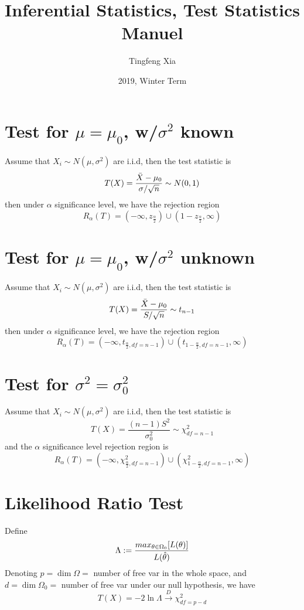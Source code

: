 \documentclass{article}
\title{Inferential Statistics, Test Statistics Manuel}
\author{Tingfeng Xia}
\date{2019, Winter Term}
\begin{document}
\maketitle

\section{Test for $\mu = \mu_0$, w/$\sigma^2$ known}
Assume that $X_i\sim N(\mu, \sigma^2)$ are i.i.d, then the test 
statistic is
\begin{equation*}
    T(X) = \frac{\Bar{X} - \mu_0}{\sigma / \sqrt{n}} \sim N(0, 1)
\end{equation*}
then under $\alpha$ significance level, we have the rejection region
\begin{equation*}
    R_\alpha(T) = ( -\infty, z_{\frac{\alpha}{2}} ) \cup 
(1-z_{\frac{\alpha}{2}}, \infty )
\end{equation*}

\section{Test for $\mu = \mu_0$, w/$\sigma^2$ unknown}
Assume that $X_i\sim N(\mu, \sigma^2)$ are i.i.d, then the test 
statistic is
\begin{equation*}
    T(X) = \frac{\Bar{X} - \mu_0}{S / \sqrt{n}} \sim t_{n-1}
\end{equation*}
then under $\alpha$ significance level, we have the rejection region
\begin{equation*}
    R_\alpha(T) = ( -\infty, t_{\frac{\alpha}{2}, df=n-1} ) \cup 
(t_{1-\frac{\alpha}{2}, df=n-1}, \infty )
\end{equation*}

\section{Test for $\sigma^2 = \sigma_0^2$}
Assume that $X_i\sim N(\mu, \sigma^2)$ are i.i.d, then the test 
statistic is
\begin{equation*}
    T(X) = \frac{(n-1)S^2}{\sigma_0^2} \sim \chi^2_{df = n-1}
\end{equation*}
and the $\alpha$ significance level rejection region is 
\begin{equation*}
    R_\alpha(T) = ( -\infty, \chi^2_{\frac{\alpha}{2}, df=n-1} ) \cup 
(\chi^2_{1-\frac{\alpha}{2}, df=n-1}, \infty )
\end{equation*}

\section{Likelihood Ratio Test}
Define
\begin{equation*}
    \Lambda := \frac{max_{\theta \in 
\Omega_0}[L(\theta)]}{L(\Hat{\theta})}
\end{equation*}
Denoting $p = \dim\Omega =$ number of free var in the whole space, and 
$d = \dim\Omega_0 =$ number of free var under our null hypothesis, we 
have
\begin{equation*}
    T(X) = -2\ln{\Lambda} \xrightarrow{D} \chi^2_{df = p-d}
\end{equation*}
\end{document}
